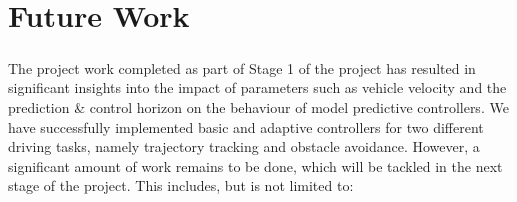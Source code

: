 \chapter{Future Work}
\paragraph{}
The project work completed as part of Stage 1 of the project has resulted in significant insights into the impact of parameters such as vehicle velocity and the prediction \& control horizon on the behaviour of model predictive controllers. We have successfully implemented basic and adaptive controllers for two different driving tasks, namely trajectory tracking and obstacle avoidance. However, a significant amount of work remains to be done, which will be tackled in the next stage of the project. This includes, but is not limited to:
